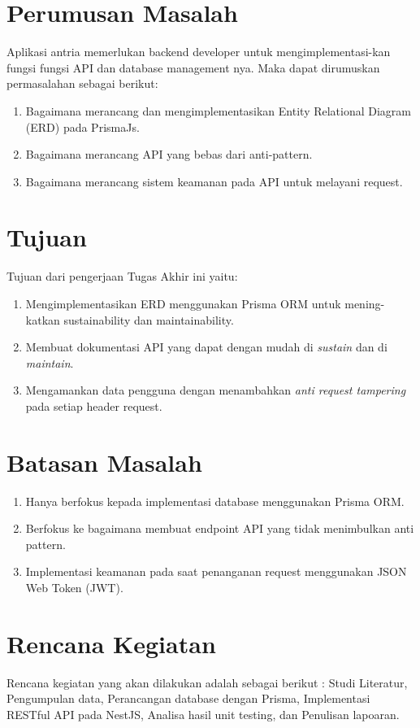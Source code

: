 \section{Perumusan Masalah}
Aplikasi antria memerlukan backend developer untuk mengimplementasi-kan fungsi fungsi API dan database management nya. Maka dapat dirumuskan permasalahan sebagai berikut:
\begin{enumerate}
  \item Bagaimana merancang dan mengimplementasikan Entity Relational Diagram (ERD) pada PrismaJs.
  \item Bagaimana merancang API yang bebas dari anti-pattern.
  \item Bagaimana merancang sistem keamanan pada API untuk melayani request.
\end{enumerate}


\section{Tujuan}
Tujuan dari pengerjaan Tugas Akhir ini yaitu:
\begin{enumerate}
  \item Mengimplementasikan ERD menggunakan Prisma ORM untuk mening-katkan sustainability dan maintainability.
  \item Membuat dokumentasi API yang dapat dengan mudah di \textit{sustain} dan di \textit{maintain}.
  \item Mengamankan data pengguna dengan menambahkan \textit{anti request tampering} pada setiap header request.
  
\end{enumerate}

\section{Batasan Masalah}
\begin{enumerate}
  \item Hanya berfokus kepada implementasi database menggunakan Prisma ORM.
  \item Berfokus ke bagaimana membuat endpoint API yang tidak menimbulkan anti pattern.
  \item Implementasi keamanan pada saat penanganan request menggunakan JSON Web Token (JWT).
\end{enumerate}

\section{Rencana Kegiatan}
Rencana kegiatan yang akan dilakukan adalah sebagai berikut : Studi Literatur, Pengumpulan data, Perancangan database dengan Prisma, Implementasi RESTful API pada NestJS, Analisa hasil unit testing, dan Penulisan lapoaran.
